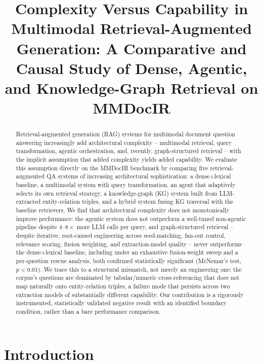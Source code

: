 \documentclass[sigconf,anonymous,review]{acmart}
\begin{document}
\title{Complexity Versus Capability in Multimodal Retrieval-Augmented Generation: A Comparative and Causal Study of Dense, Agentic, and Knowledge-Graph Retrieval on MMDocIR}

\begin{abstract}
Retrieval-augmented generation (RAG) systems for multimodal document question answering increasingly add architectural complexity -- multimodal retrieval, query transformation, agentic orchestration, and, recently, graph-structured retrieval -- with the implicit assumption that added complexity yields added capability. We evaluate this assumption directly on the MMDocIR benchmark by comparing five retrieval-augmented QA systems of increasing architectural sophistication: a dense+lexical baseline, a multimodal system with query transformation, an agent that adaptively selects its own retrieval strategy, a knowledge-graph (KG) system built from LLM-extracted entity-relation triples, and a hybrid system fusing KG traversal with the baseline retrievers. We find that architectural complexity does not monotonically improve performance: the agentic system does not outperform a well-tuned non-agentic pipeline despite $4$--$8\times$ more LLM calls per query, and graph-structured retrieval -- despite iterative, root-caused engineering across seed-matching, fan-out control, relevance scoring, fusion weighting, and extraction-model quality -- never outperforms the dense+lexical baseline, including under an exhaustive fusion-weight sweep and a per-question rescue analysis, both confirmed statistically significant (McNemar's test, $p<0.01$). We trace this to a structural mismatch, not merely an engineering one: the corpus's questions are dominated by tabular/numeric cross-referencing that does not map naturally onto entity-relation triples, a failure mode that persists across two extraction models of substantially different capability. Our contribution is a rigorously instrumented, statistically validated negative result with an identified boundary condition, rather than a bare performance comparison.
\end{abstract}

\maketitle

\section{Introduction}
\end{document}
